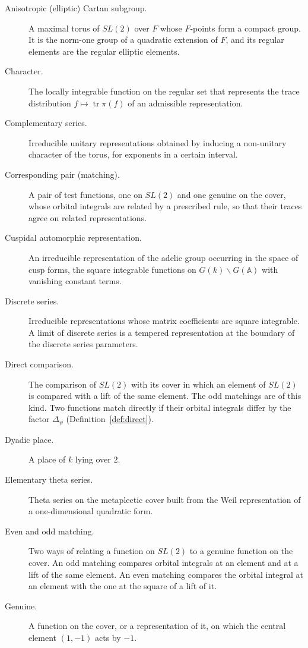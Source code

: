 \documentclass[12pt,letterpaper,openany]{book}
\theoremstyle{plain}
\theoremstyle{definition}
\theoremstyle{remark}
\theoremstyle{remark}
\newcommand{\tr}{\operatorname{tr}}
\begin{document}
\begin{description}
\item[Anisotropic (elliptic) Cartan subgroup.] A maximal torus of $SL(2)$
over $F$ whose $F$-points form a compact group. It is the norm-one group of
a quadratic extension of $F$, and its regular elements are the regular
elliptic elements.
\item[Character.] The locally integrable function on the regular set that
represents the trace distribution $f\mapsto\tr\pi(f)$ of an admissible
representation.
\item[Complementary series.] Irreducible unitary representations obtained
by inducing a non-unitary character of the torus, for exponents in a
certain interval.
\item[Corresponding pair (matching).] A pair of test functions, one on
$SL(2)$ and one genuine on the cover, whose orbital integrals are related by
a prescribed rule, so that their traces agree on related representations.
\item[Cuspidal automorphic representation.] An irreducible representation
of the adelic group occurring in the space of cusp forms, the square
integrable functions on $G(k)\backslash G({\mathbb A})$ with vanishing constant
terms.
\item[Discrete series.] Irreducible representations whose matrix
coefficients are square integrable. A limit of discrete series is a
tempered representation at the boundary of the discrete series parameters.
\item[Direct comparison.] The comparison of $SL(2)$ with its cover in
which an element of $SL(2)$ is compared with a lift of the same element.
The odd matchings are of this kind. Two functions match directly if
their orbital integrals differ by the factor $\Delta_\psi$
(Definition~\ref{def:direct}).
\item[Dyadic place.] A place of $k$ lying over $2$.
\item[Elementary theta series.] Theta series on the metaplectic cover
built from the Weil representation of a one-dimensional quadratic form.
\item[Even and odd matching.] Two ways of relating a function on $SL(2)$
to a genuine function on the cover. An odd matching compares orbital
integrals at an element and at a lift of the same element. An even
matching compares the orbital integral at an element with the one at the
square of a lift of it.
\item[Genuine.] A function on the cover, or a representation of it, on
which the central element $(1,-1)$ acts by $-1$.

\end{description}
\end{document}
